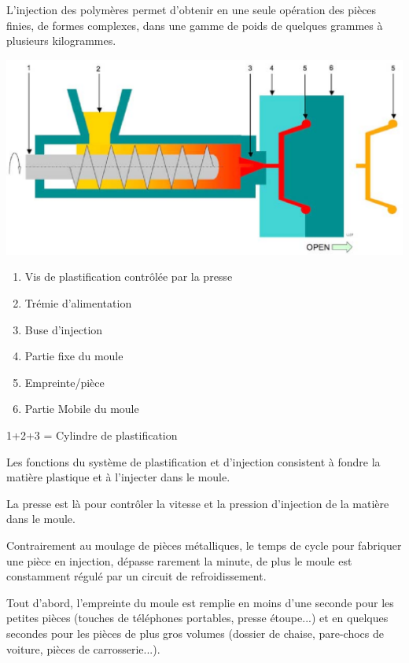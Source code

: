 \documentclass[11pt,oneside]{article}
\begin{document}
       L'injection des polymères permet d'obtenir en une seule opération des
 pièces finies, de  formes  complexes,  dans  une  gamme  de  poids  de 
quelques  grammes  à plusieurs  kilogrammes. 
\begin{multicols}{2}

\begin{center}
 \includegraphics[width=.45\textwidth]{png/injection}
\end{center}
                                
\begin{enumerate}
\item Vis de plastification contrôlée par la presse     
\item Trémie d'alimentation 
\item Buse d'injection 
\item Partie fixe du moule 
\item Empreinte/pièce 
\item Partie Mobile du moule
\end{enumerate}

       1+2+3 = Cylindre de plastification                                   
    
       
\end{multicols}
        Les  fonctions  du  système  de  plastification  et  d'injection 
consistent  à  fondre  la  matière plastique et à l'injecter dans le moule. 

        La presse est là pour contrôler la vitesse et la pression d'injection de
la matière dans le moule. 

        Contrairement  au  moulage  de  pièces  métalliques,  le  temps  de 
cycle  pour  fabriquer  une  pièce  en  injection,  dépasse  rarement  la 
minute,  de  plus  le  moule est  constamment régulé par un circuit de
refroidissement. 

Tout  d'abord,  l'empreinte  du  moule  est  remplie  en  moins  d'une 
seconde  pour  les petites  pièces  (touches  de  téléphones 
portables,  presse étoupe...)  et  en  quelques secondes  pour  les 
pièces  de  plus  gros  volumes  (dossier  de chaise,  pare-chocs  de  
voiture, pièces de carrosserie...). 
\end{document}
